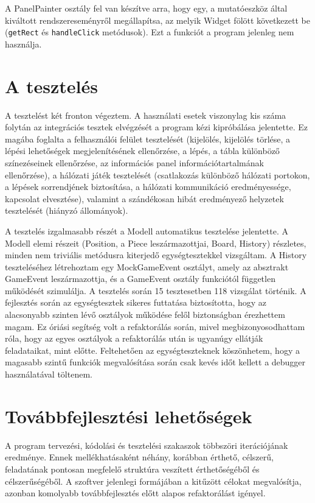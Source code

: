 \documentclass[12pt, twoside]{report}
\begin{document}
A PanelPainter osztály fel van készítve arra, hogy egy, a mutatóeszköz által kiváltott rendszereseményről megállapítsa, az melyik Widget fölött következett be ({\tt getRect} és {\tt handleClick} metódusok). Ezt a funkciót a program jelenleg nem használja.

\section{A tesztelés}

A tesztelést két fronton végeztem. A használati esetek viszonylag kis száma folytán az integrációs tesztek elvégzését a program kézi kipróbálása jelentette. Ez magába foglalta a felhasználói felület tesztelését (kijelölés, kijelölés törlése, a lépési lehetőségek megjelenítésének ellenőrzése, a lépés, a tábla különböző színezéseinek ellenőrzése, az információs panel információtartalmának ellenőrzése), a hálózati játék tesztelését (csatlakozás különböző hálózati portokon, a lépések sorrendjének biztosítása, a hálózati kommunikáció eredményessége, kapcsolat elvesztése), valamint a szándékosan hibát eredményező helyzetek tesztelését (hiányzó állományok).

A tesztelés izgalmasabb részét a Modell automatikus tesztelése jelentette. A Modell elemi részeit (Position, a Piece leszármazottjai, Board, History) részletes, minden nem triviális metódusra kiterjedő egységtesztekkel vizsgáltam. A History teszteléséhez létrehoztam egy MockGameEvent osztályt, amely az absztrakt GameEvent leszármazottja, és a GameEvent osztály funkciótól független működését szimulálja. A tesztelés során 15 tesztesetben 118 vizsgálat történik. A fejlesztés során az egységtesztek sikeres futtatása biztosította, hogy az alacsonyabb szinten lévő osztályok működése felől biztonságban érezhettem magam. Ez óriási segítség volt a refaktorálás során, mivel megbizonyosodhattam róla, hogy az egyes osztályok a refaktorálás után is ugyanúgy ellátják feladataikat, mint előtte. Feltehetően az egységteszteknek köszönhetem, hogy a magasabb szintű funkciók megvalósítása során csak kevés időt kellett a debugger használatával töltenem.

\section{Továbbfejlesztési lehetőségek}

A program tervezési, kódolási és tesztelési szakaszok többszöri iterációjának eredménye. Ennek mellékhatásaként néhány, korábban érthető, célszerű, feladatának pontosan megfelelő struktúra veszített érthetőségéből és célszerűségéből. A szoftver jelenlegi formájában a kitűzött célokat megvalósítja, azonban komolyabb továbbfejlesztés előtt alapos refaktorálást igényel.
\end{document}
